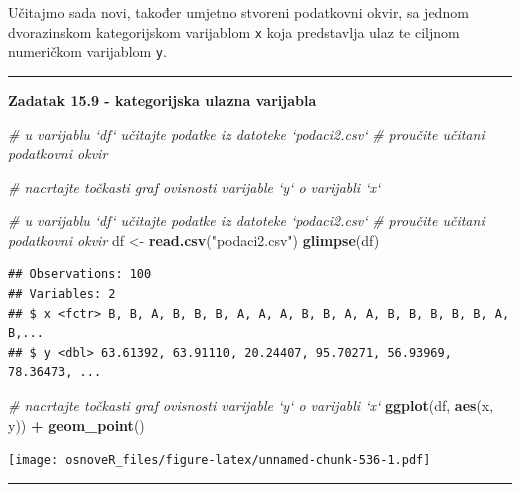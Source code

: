 \documentclass[]{book}
\newenvironment{Shaded}{\begin{snugshade}}{\end{snugshade}}
\newcommand{\KeywordTok}[1]{\textcolor[rgb]{0.13,0.29,0.53}{\textbf{#1}}}
\newcommand{\StringTok}[1]{\textcolor[rgb]{0.31,0.60,0.02}{#1}}
\newcommand{\CommentTok}[1]{\textcolor[rgb]{0.56,0.35,0.01}{\textit{#1}}}
\newcommand{\OperatorTok}[1]{\textcolor[rgb]{0.81,0.36,0.00}{\textbf{#1}}}
\newcommand{\NormalTok}[1]{#1}
\theoremstyle{definition}
\theoremstyle{definition}
\theoremstyle{definition}
\theoremstyle{remark}
\begin{document}
Učitajmo sada novi, također umjetno stvoreni podatkovni okvir, sa jednom
dvorazinskom kategorijskom varijablom \texttt{x} koja predstavlja ulaz
te ciljnom numeričkom varijablom \texttt{y}.

\begin{center}\rule{0.5\linewidth}{\linethickness}\end{center}

\textbf{Zadatak 15.9 - kategorijska ulazna varijabla}

\begin{Shaded}
\begin{Highlighting}[]
\CommentTok{# u varijablu `df` učitajte podatke iz datoteke `podaci2.csv`}
\CommentTok{# proučite učitani podatkovni okvir}

\CommentTok{# nacrtajte točkasti graf ovisnosti varijable `y` o varijabli `x`}
\end{Highlighting}
\end{Shaded}

\begin{Shaded}
\begin{Highlighting}[]
\CommentTok{# u varijablu `df` učitajte podatke iz datoteke `podaci2.csv`}
\CommentTok{# proučite učitani podatkovni okvir}
\NormalTok{df <-}\StringTok{ }\KeywordTok{read.csv}\NormalTok{(}\StringTok{"podaci2.csv"}\NormalTok{)}
\KeywordTok{glimpse}\NormalTok{(df)}
\end{Highlighting}
\end{Shaded}

\begin{verbatim}
## Observations: 100
## Variables: 2
## $ x <fctr> B, B, A, B, B, B, A, A, A, B, B, A, A, B, B, B, B, B, A, B,...
## $ y <dbl> 63.61392, 63.91110, 20.24407, 95.70271, 56.93969, 78.36473, ...
\end{verbatim}

\begin{Shaded}
\begin{Highlighting}[]
\CommentTok{# nacrtajte točkasti graf ovisnosti varijable `y` o varijabli `x`}
\KeywordTok{ggplot}\NormalTok{(df, }\KeywordTok{aes}\NormalTok{(x, y)) }\OperatorTok{+}\StringTok{ }\KeywordTok{geom_point}\NormalTok{() }
\end{Highlighting}
\end{Shaded}

\texttt{[image: osnoveR\_files/figure-latex/unnamed-chunk-536-1.pdf]}

\begin{center}\rule{0.5\linewidth}{\linethickness}\end{center}
\end{document}
